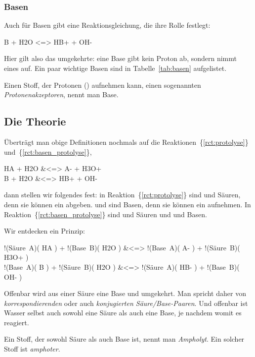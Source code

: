 \documentclass{arbeitsblatt}
\newcommand*\rctref[1]{\{\ref{#1}\}}
\begin{document}
\subsubsection{Basen}
Auch für Basen gibt eine Reaktionsgleichung, die ihre Rolle festlegt:
\begin{reaction}
  B + H2O <=> HB+ + OH- \label{rct:basen_protolyse}
\end{reaction}
Hier gilt also das umgekehrte: eine Base gibt kein Proton ab, sondern nimmt
eines auf. Ein paar wichtige Basen sind in Tabelle~\ref{tab:basen} aufgelistet.
\begin{definition}
  Einen Stoff, der Protonen (\Hpl) aufnehmen kann, einen sogenannten
  \emph{Protonenakzeptoren}, nennt man Base.
\end{definition}

\subsection{Die Theorie}
Überträgt man obige Definitionen nochmals auf die
Reaktionen~\rctref{rct:protolyse} und~\rctref{rct:basen_protolyse},
\begin{reactions*}
  HA + H2O &<=> A- + H3O+ \\
  B  + H2O &<=> HB+ + OH-
\end{reactions*}
dann stellen wir folgendes fest: in Reaktion~\rctref{rct:protolyse} sind
 und  Säuren, denn sie können ein  abgeben.  
und  sind Basen, denn sie können ein  aufnehmen.  In
Reaktion~\rctref{rct:basen_protolyse} sind  und  Säuren und
 und  Basen.

Wir entdecken ein Prinzip:
\begin{reactions*}
       !(\color{red}Säure~A)( HA )  + !(\color{blue}Base~B)( H2O )
  &<=> !(\color{red}Base~A)( A- )   + !(\color{blue}Säure~B)( H3O+ ) \\
       !(\color{red}Base~A)( B )    + !(\color{blue}Säure~B)( H2O )
  &<=> !(\color{red}Säure~A)( HB- ) + !(\color{blue}Base~B)( OH- )
\end{reactions*}
Offenbar wird aus einer Säure eine Base und umgekehrt.  Man spricht daher von
\emph{korrespondierenden} oder auch \emph{konjugierten Säure/Base-Paaren}.
Und offenbar ist Wasser selbst auch sowohl eine Säure als auch eine Base, je
nachdem womit es reagiert.

\begin{definition}
  Ein Stoff, der sowohl Säure als auch Base ist, nennt man
  \emph{Ampholyt}. Ein solcher Stoff ist \emph{amphoter}.
\end{definition}
\end{document}
